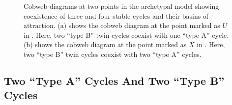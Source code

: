 \begin{figure}
	\centering
	\caption[Cobweb diagrams of the archetypal model showing coexistence of up to four cycles]{
		Cobweb diagrams at two points in the archetypal model showing coexistence of three and four stable cycles and their basins of attraction.
		(a) shows the cobweb diagram at the point marked as $U$ in .
		Here, two ``type B'' twin cycles coexist with one ``type A'' cycle.
		(b) shows the cobweb diagram at the point marked as $X$ in .
		Here, two ``type B'' twin cycles coexist with two ``type A'' cycles.
	}
\end{figure}

\subsection{Two ``Type A'' Cycles And Two ``Type B'' Cycles}

